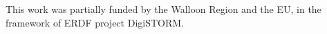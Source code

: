 \documentclass[final]{beamer}
\newlength{\onecolwid}
\begin{document}
\begin{frame}[t]
\begin{columns}[t]
\begin{column}{\onecolwid}





This work was partially funded by the Walloon Region and the EU, in the framework of ERDF project DigiSTORM.


\end{column} %

\end{columns} %

\end{frame} %
\end{document}
